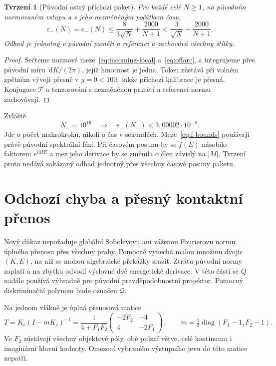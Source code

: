 \documentclass[11pt,a4paper]{article}
\newcommand{\dd}{\,\mathrm d}
\newcommand{\Tcal}{\mathcal T}
\newcommand{\eps}{\varepsilon}
\newtheorem{theorem}{Tvrzení}[section]
\theoremstyle{remark}\newtheorem{remark}[theorem]{Poznámka}
\numberwithin{equation}{section}
\begin{document}
\begin{theorem}[Původní ostrý příchozí paket]
Pro každé celé \(N\ge1\), na původním normovaném vstupu a s jeho nezměněným počátkem času,
\begin{equation}
\eps_-(N)=e_-(N)
\le\frac{8}{3\sqrt N}+\frac{2000}{N+1}
<\frac3{\sqrt N}+\frac{2000}{N+1}.
\label{eq:incoming-final}
\end{equation}
Odhad je jednotný v původní paměti a referenci a zachovává všechny štítky.
\end{theorem}
\begin{proof}
Sečteme normové meze~\eqref{eq:incoming-local} a~\eqref{eq:offarc}, a integrujeme přes původní míru \(\dd K/(2\pi)\), jejíž hmotnost je jedna. Token zůstává při volném zpětném vývoji přesně v \(y=0<100\), takže příchozí kalibrace je přesná. Konjugace \(\Tcal\) a tenzorování s nezměněnou pamětí a referencí normu zachovávají.
\end{proof}
Zvláště
\begin{equation}
N_-=10^{16}\quad\Longrightarrow\quad
\eps_-(N_-)<3{,}00002\cdot10^{-8}.
\label{eq:Nminus}
\end{equation}
Jde o počet makrokroků, nikoli o čas v sekundách. Meze~\eqref{eq:f-bounds} používají právě původní spektrální fázi. Při časovém posunu by se \(f(E)\) násobilo faktorem \(e^{iME}\) a mez jeho derivace by se změnila o člen závislý na \(|M|\). Tvrzení proto nedává zakázaný odhad jednotný přes všechny časové posuny paketu.

\section{Odchozí chyba a přesný kontaktní přenos}
\label{sec:outgoing}

Nový důkaz nepožaduje globální Sobolevovu ani váženou Fourierovu normu úplného přenosu přes všechny prahy. Pomocně vynechá malou množinu dvojic \((K,E)\), na níž se mohou algebraické překážky srazit. Ztrátu původní normy zaplatí a na zbytku odvodí výslovné dvě energetické derivace. V této části se \(Q\) nadále používá výhradně pro původní pravděpodobnostní projektor. Pomocný diskriminační polynom bude označen \(\mathscr Q\).

Na jednom vlákně je úplná přenosová matice
\begin{equation}
T=K_c(I-mK_c)^{-1}
=\frac1{4+F_1F_2}
\begin{pmatrix}-2F_2&-4\\4&-2F_1\end{pmatrix},
\qquad m=\tfrac12\operatorname{diag}(F_1-1,F_2-1).
\label{eq:fullT}
\end{equation}
Ve \(F_2\) zůstávají všechny objektové póly, obě pulzní větve, celé kontinuum i imaginární hlavní hodnoty. Omezení vybraného výstupního jevu do této matice nepatří.
\end{document}
